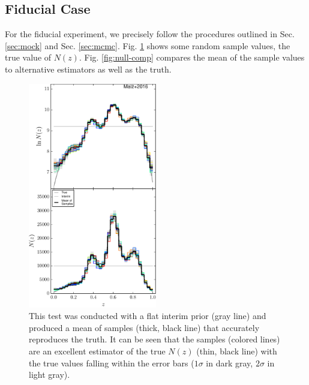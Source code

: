 \documentclass[preprint]{aastex}
\begin{document}
\clearpage
\subsection{Fiducial Case}
\label{sec:null}

For the fiducial experiment, we precisely follow the procedures outlined in 
Sec. \ref{sec:mock} and Sec. \ref{sec:mcmc}.  Fig. \ref{fig:null-samp} shows 
some random sample values, the true value of $N(z)$.  Fig. \ref{fig:null-comp} 
compares the mean of the sample values to alternative estimators as well as the 
truth.

\begin{figure}
\includegraphics[width=0.5\textwidth]{figs/null/samps.pdf}
\caption{This test was conducted with a flat interim prior (gray line) and 
produced a mean of samples (thick, black line) that accurately reproduces the 
truth.  It can be seen that the samples (colored lines) are an excellent 
estimator of the true $N(z)$ (thin, black line) with the true values falling 
within the error bars ($1\sigma$ in dark gray, $2\sigma$ in light gray).}
\label{fig:null-samp}
\end{figure}
\end{document}
